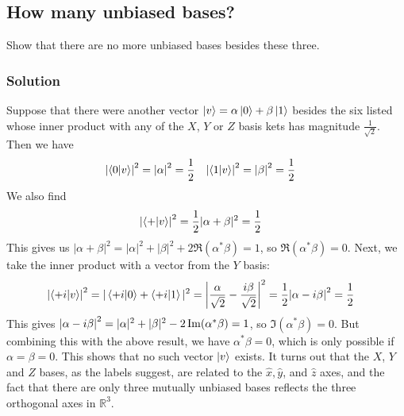 \documentclass{article}
\begin{document}
\subsection*{How many unbiased bases?}
Show that there are no more unbiased bases besides these three.

\subsubsection*{Solution}
Suppose that there were another vector $\ket{v} = \alpha \ket{0} + \beta \ket{1}$ besides the six listed whose inner product with any of the $X$, $Y$ or $Z$ basis kets has magnitude $\frac{1}{\sqrt{2}}$. Then we have
\begin{align*}
\qty|\braket{0}{v}|^2 &= \qty|\alpha|^2 = \frac{1}{2} & \qty|\braket{1}{v}|^2 &= \qty|\beta|^2 = \frac{1}{2}
\end{align*}
We also find
\begin{align*}
\qty|\braket{+}{v}|^2 &= \frac{1}{2}|\alpha + \beta|^2 = \frac{1}{2}
\end{align*}
This gives us $|\alpha + \beta|^2 = |\alpha|^2 + |\beta|^2 + 2\Re(\alpha^\ast \beta) = 1$, so $\Re(\alpha^\ast \beta) = 0$. Next, we take the inner product with a vector from the $Y$ basis: 
\begin{align*}
\qty|\braket{+i}{v}|^2 &= |\braket{+i}{0} + \braket{+i}{1}|^2 = \qty|\frac{\alpha}{\sqrt{2}} - \frac{i\beta}{\sqrt{2}}|^2 = \frac{1}{2}\qty|\alpha - i\beta|^2 = \frac{1}{2}
\end{align*}
This gives $\qty|\alpha - i\beta|^2 = |\alpha|^2 + |\beta|^2 -2\Im(\alpha^\ast \beta) = 1$, so $\Im(\alpha^\ast \beta) = 0$. But combining this with the above result, we have $\alpha^\ast \beta = 0$, which is only possible if $\alpha = \beta =0$. This shows that no such vector $\ket{v}$ exists. It turns out that the $X$, $Y$ and $Z$ bases, as the labels suggest, are related to the $\hat x, \hat y$, and $\hat z$ axes, and the fact that there are only three mutually unbiased bases reflects the three orthogonal axes in $\mathbb R^3$. 
\end{document}
